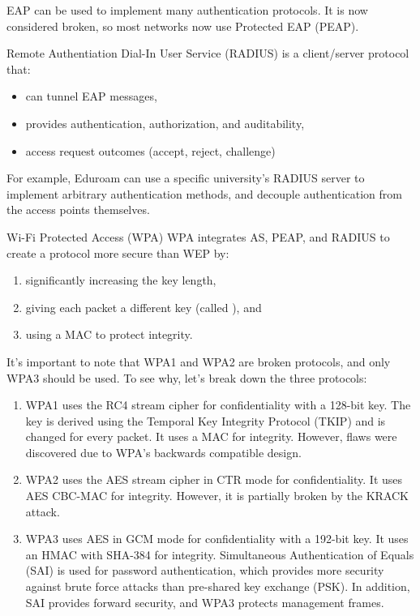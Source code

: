 EAP can be used to implement many authentication protocols. It is now considered broken, so most networks now use Protected EAP (PEAP).

\begin{dfnbox}{Remote Authentiation Dial-In User Service (RADIUS)}{}
     is a client/server protocol that:
    \begin{itemize}
        \item can tunnel EAP messages,
        \item provides authentication, authorization, and auditability,
        \item access request outcomes (accept, reject, challenge)
    \end{itemize}
\end{dfnbox}

For example, Eduroam can use a specific university's RADIUS server to implement arbitrary authentication methods, and decouple authentication from the access points themselves.

\begin{dfnbox}{Wi-Fi Protected Access (WPA)}{}
    WPA integrates AS, PEAP, and RADIUS to create a protocol more secure than WEP by:
    \begin{enumerate}
        \item significantly increasing the key length,
        \item giving each packet a different key (called ), and
        \item using a MAC to protect integrity.
    \end{enumerate}
\end{dfnbox}


It's important to note that WPA1 and WPA2 are broken protocols, and only WPA3 should be used. To see why, let's break down the three protocols:
\begin{enumerate}
    \item WPA1 uses the RC4 stream cipher for confidentiality with a 128-bit key. The key is derived using the Temporal Key Integrity Protocol (TKIP) and is changed for every packet. It uses a MAC for integrity. However, flaws were discovered due to WPA's backwards compatible design.
    \item WPA2 uses the AES stream cipher in CTR mode for confidentiality. It uses AES CBC-MAC for integrity. However, it is partially broken by the KRACK attack.
    \item WPA3 uses AES in GCM mode for confidentiality with a 192-bit key. It uses an HMAC with SHA-384 for integrity. Simultaneous Authentication of Equals (SAI) is used for password authentication, which provides more security against brute force attacks than pre-shared key exchange (PSK). In addition, SAI provides forward security, and WPA3 protects management frames.
\end{enumerate}
